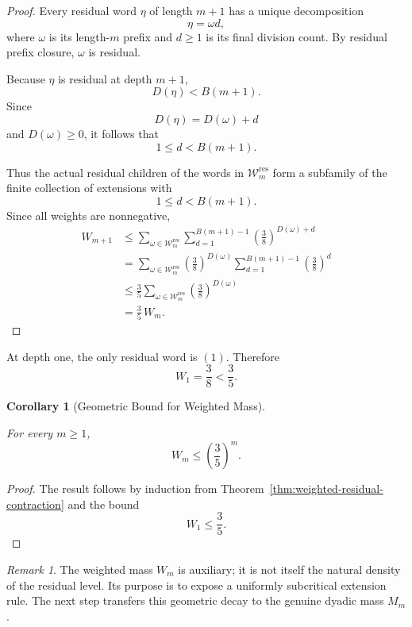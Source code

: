 \documentclass[12pt, oneside]{article}
\numberwithin{equation}{section}
\theoremstyle{definition}
\theoremstyle{plain}
\newtheorem{corollary}[theorem]{Corollary}
\theoremstyle{remark}
\newtheorem*{remark}{Remark}
\begin{document}
\begin{proof}
Every residual word \(\eta\) of length \(m+1\) has a unique decomposition
\[
\eta=\omega d,
\]
where \(\omega\) is its length-\(m\) prefix and \(d\ge1\) is its final
division count. By residual prefix closure, \(\omega\) is residual.

Because \(\eta\) is residual at depth \(m+1\),
\[
D(\eta)<B(m+1).
\]
Since
\[
D(\eta)=D(\omega)+d
\]
and \(D(\omega)\ge0\), it follows that
\[
1\le d<B(m+1).
\]

Thus the actual residual children of the words in
\(\mathcal W_m^{\mathrm{res}}\) form a subfamily of the finite collection
of extensions with
\[
1\le d<B(m+1).
\]
Since all weights are nonnegative,
\[
\begin{aligned}
W_{m+1}
&\le
\sum_{\omega\in\mathcal W_m^{\mathrm{res}}}
\sum_{d=1}^{B(m+1)-1}
\left(\frac38\right)^{D(\omega)+d}
\\[4pt]
&=
\sum_{\omega\in\mathcal W_m^{\mathrm{res}}}
\left(\frac38\right)^{D(\omega)}
\sum_{d=1}^{B(m+1)-1}
\left(\frac38\right)^d
\\[4pt]
&\le
\frac35
\sum_{\omega\in\mathcal W_m^{\mathrm{res}}}
\left(\frac38\right)^{D(\omega)}
\\[4pt]
&=
\frac35\,W_m.
\end{aligned}
\]
\end{proof}

At depth one, the only residual word is \((1)\). Therefore
\[
W_1=\frac38<\frac35.
\]

\begin{corollary}[Geometric Bound for Weighted Mass]
\label{cor:weighted-residual-geometric-bound}

For every \(m\ge1\),
\[
\boxed{
W_m\le\left(\frac35\right)^m.
}
\]
\end{corollary}

\begin{proof}
The result follows by induction from
Theorem~\ref{thm:weighted-residual-contraction} and the bound
\[
W_1\le\frac35.
\]
\end{proof}

\begin{remark}
The weighted mass \(W_m\) is auxiliary; it is not itself the natural density
of the residual level. Its purpose is to expose a uniformly subcritical
extension rule. The next step transfers this geometric decay to the genuine
dyadic mass \(M_m\).
\end{remark}

\end{document}
